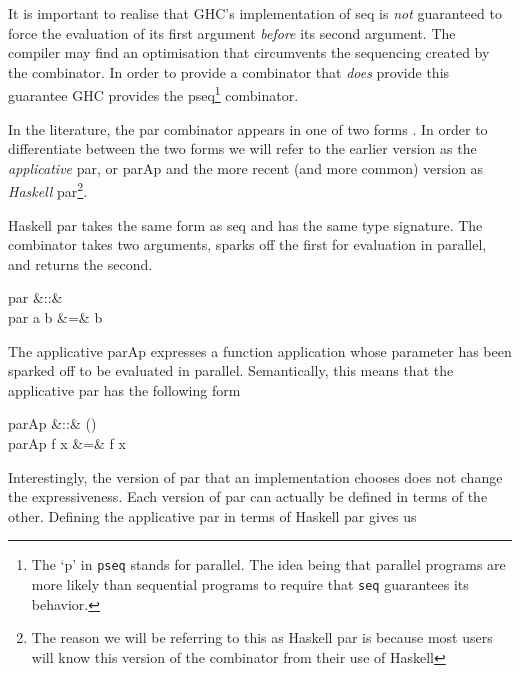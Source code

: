 It is important to realise that GHC's implementation of \<seq\> is
\emph{not} guaranteed to force the evaluation of its first argument
\emph{before} its second argument. The compiler may find an optimisation that
circumvents the sequencing created by the combinator. In order to provide a
combinator that \emph{does} provide this guarantee GHC provides the
\<pseq\>\footnote{The `p' in \texttt{pseq} stands for parallel.  The idea
being that parallel programs are more likely than sequential programs to
require that \texttt{seq} guarantees its behavior.} combinator.

In the literature, the \<par\> combinator appears in one of two forms
\citep{HistoryOfHaskell, hughes:thesis}. In order to differentiate between the
two forms we will refer to the earlier version as the \emph{applicative} par, or
\<parAp\> and the more recent (and more common) version as \emph{Haskell}
\<par\>\footnote{The reason we will be referring to this as Haskell par is
because most users will know this version of the combinator from their use of
Haskell}.

Haskell \<par\> takes the same form as \<seq\> and has the same type
signature. The combinator takes two arguments, sparks off the first for
evaluation in parallel, and returns the second.

\begin{haskell}
par &::& \hasalpha \to \hasbeta \to \hasbeta \\
par a b &=& b
\end{haskell}

The applicative \<parAp\> expresses a function application whose parameter has been
sparked off to be evaluated in parallel. Semantically, this means that the
applicative par has the following form

\begin{haskell}
parAp &::& (\hasalpha \to \hasbeta) \to \hasalpha \to \hasbeta \\
parAp f x &=& f x
\end{haskell}


Interestingly, the version of \<par\> that an implementation chooses does
not change the expressiveness. Each version of \<par\> can actually be
defined in terms of the other. Defining the applicative par in terms of Haskell
par gives us

